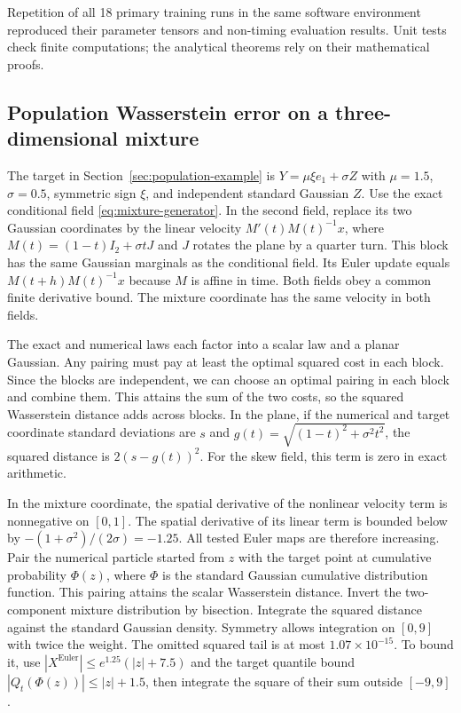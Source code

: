 Repetition of all 18 primary training runs in the same software environment
reproduced their parameter tensors and non-timing evaluation results.
Unit tests check finite computations; the analytical theorems rely on their
mathematical proofs.

\subsection{Population Wasserstein error on a three-dimensional mixture}
\label{app:population-example}
The target in Section~\ref{sec:population-example} is
$Y=\mu\xi e_1+\sigma Z$ with $\mu=1.5$, $\sigma=0.5$, symmetric sign
$\xi$, and independent standard Gaussian $Z$. Use the exact conditional
field \eqref{eq:mixture-generator}. In the second field, replace its
two Gaussian coordinates by the linear velocity $M'(t)M(t)^{-1}x$,
where $M(t)=(1-t)I_2+\sigma tJ$ and $J$ rotates the plane by a quarter
turn. This block has the same Gaussian marginals as the conditional
field. Its Euler update equals $M(t+h)M(t)^{-1}x$ because $M$ is affine
in time. Both fields obey a common finite derivative bound. The
mixture coordinate has the same velocity in both fields.

The exact and numerical laws each factor into a scalar law and a planar
Gaussian. Any pairing must pay at least the optimal squared cost in
each block. Since the blocks are independent, we can choose an optimal
pairing in each block and combine them. This attains the sum of the
two costs, so the squared Wasserstein distance adds across blocks.
In the plane, if the numerical and target coordinate standard deviations
are $s$ and $g(t)=\sqrt{(1-t)^2+\sigma^2t^2}$, the squared distance is
$2(s-g(t))^2$. For the skew field, this term is zero in exact arithmetic.

In the mixture coordinate, the spatial derivative of the nonlinear
velocity term is nonnegative on $[0,1]$. The spatial derivative of its linear term is
bounded below by $-(1+\sigma^2)/(2\sigma)=-1.25$. All tested Euler maps
are therefore increasing. Pair the numerical particle started from $z$
with the target point at cumulative probability $\Phi(z)$, where $\Phi$
is the standard Gaussian cumulative distribution function. This pairing
attains the scalar Wasserstein distance. Invert the two-component mixture
distribution by bisection. Integrate the squared distance against the
standard Gaussian density. Symmetry allows integration on $[0,9]$ with
twice the weight. The omitted squared tail is at most $1.07\times10^{-15}$.
To bound it, use $|X^{\mathrm{Euler}}|\le e^{1.25}(|z|+7.5)$ and the
target quantile bound $|Q_t(\Phi(z))|\le |z|+1.5$, then integrate the
square of their sum outside $[-9,9]$.

